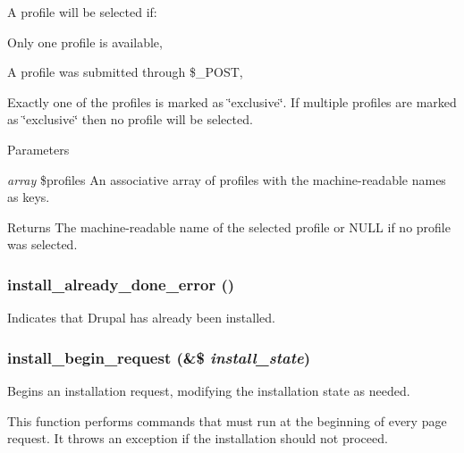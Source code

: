 A profile will be selected if:
\begin{DoxyItemize}
\item Only one profile is available,
\item A profile was submitted through \$\_\-POST,
\item Exactly one of the profiles is marked as \char`\"{}exclusive\char`\"{}. If multiple profiles are marked as \char`\"{}exclusive\char`\"{} then no profile will be selected.
\end{DoxyItemize}


\begin{DoxyParams}{Parameters}
\item[{\em array}]\$profiles An associative array of profiles with the machine-\/readable names as keys.\end{DoxyParams}
\begin{DoxyReturn}{Returns}
The machine-\/readable name of the selected profile or NULL if no profile was selected. 
\end{DoxyReturn}
\hypertarget{install_8core_8inc_a6469cc717a3ac52eece0537630addea4}{
\subsubsection[{install\_\-already\_\-done\_\-error}]{\setlength{\rightskip}{0pt plus 5cm}install\_\-already\_\-done\_\-error ()}}
\label{install_8core_8inc_a6469cc717a3ac52eece0537630addea4}
Indicates that Drupal has already been installed. \hypertarget{install_8core_8inc_a4c7572aea2e36952bbd5e73e22eb66f8}{
\subsubsection[{install\_\-begin\_\-request}]{\setlength{\rightskip}{0pt plus 5cm}install\_\-begin\_\-request (\&\$ {\em install\_\-state})}}
\label{install_8core_8inc_a4c7572aea2e36952bbd5e73e22eb66f8}
Begins an installation request, modifying the installation state as needed.

This function performs commands that must run at the beginning of every page request. It throws an exception if the installation should not proceed.


